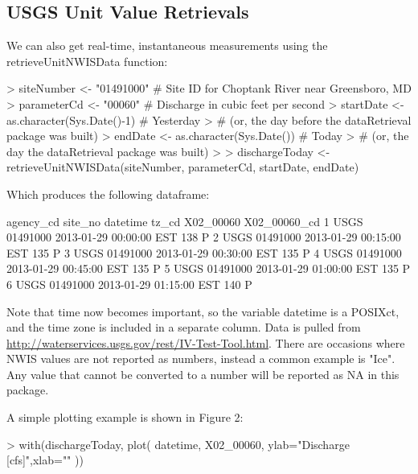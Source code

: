 \documentclass[a4paper,11pt]{article}
\begin{document}
\subsection{USGS Unit Value Retrievals}
We can also get real-time, instantaneous measurements using the retrieveUnitNWISData function:
\begin{Schunk}
\begin{Sinput}
> siteNumber <- "01491000" # Site ID for Choptank River near Greensboro, MD
> parameterCd <- "00060"  # Discharge in cubic feet per second
> startDate <- as.character(Sys.Date()-1) # Yesterday 
>   # (or, the day before the dataRetrieval package was built)
> endDate <- as.character(Sys.Date()) # Today 
>   # (or, the day the dataRetrieval package was built)
> 
> dischargeToday <- retrieveUnitNWISData(siteNumber, parameterCd, 
         startDate, endDate)
\end{Sinput}
\end{Schunk}
Which produces the following dataframe:
\begin{Schunk}
\begin{Soutput}
  agency_cd  site_no            datetime tz_cd X02_00060 X02_00060_cd
1      USGS 01491000 2013-01-29 00:00:00   EST       138            P
2      USGS 01491000 2013-01-29 00:15:00   EST       135            P
3      USGS 01491000 2013-01-29 00:30:00   EST       135            P
4      USGS 01491000 2013-01-29 00:45:00   EST       135            P
5      USGS 01491000 2013-01-29 01:00:00   EST       135            P
6      USGS 01491000 2013-01-29 01:15:00   EST       140            P
\end{Soutput}
\end{Schunk}

Note that time now becomes important, so the variable datetime is a POSIXct, and the time zone is included in a separate column. Data is pulled from \url{http://waterservices.usgs.gov/rest/IV-Test-Tool.html}. There are occasions where NWIS values are not reported as numbers, instead a common example is "Ice".  Any value that cannot be converted to a number will be reported as NA in this package.

A simple plotting example is shown in Figure 2:
\begin{Schunk}
\begin{Sinput}
> with(dischargeToday, plot(
   datetime, X02_00060,
   ylab="Discharge [cfs]",xlab=""
   ))
\end{Sinput}
\end{Schunk}
\newpage
\end{document}
